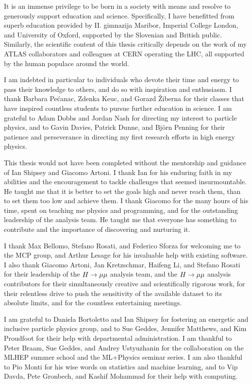 \begin{acknowledgements}

It is an immense privilege to be born in a society with means and resolve
to generously support education and science. Specifically, I have benefitted
from superb education provided by II. gimnazija Maribor, Imperial College
London, and University of Oxford, supported by the Slovenian and British
public. Similarly, the scientific content of this thesis critically depends
on the work of my ATLAS collaborators and colleagues at CERN operating the
LHC, all supported by the human populace around the world.

I am indebted in particular to individuals who devote their time and energy
to pass their knowledge to others, and do so with inspiration and enthusiasm.
I thank Barbara Pe\'canac, Zdenka Keuc, and Gorazd
\v{Z}iberna for their classes that have inspired countless students to pursue
further education in science. I am grateful to Adam Dobbs and Jordan Nash for
directing my interest to particle physics, and to Gavin Davies, Patrick Dunne,
and Bj\"{o}rn Penning for their patience and perseverance in directing my
first research efforts in high energy physics.

This thesis would not have been completed without the mentorship and guidance
of Ian Shipsey and Giacomo Artoni. I thank Ian for his enduring faith in my
abilities and the encouragement to tackle challenges that seemed insurmountable.
He taught me that it is better to set the goals high and never reach them,
than to set them too low and achieve them.
I thank Giacomo for the many hours of his time, spent on teaching me physics and
programming, and for the outstanding leadership of the analysis team. He taught
me that everyone has something to contribute and the importance of discovering 
and nurturing it.

I thank Max Bellomo, Stefano Rosati, and Federico Sforza for welcoming me to
the MCP group, and Arthur Lesage for his invaluable help with existing
software. I also thank Giacomo Artoni, Jan Kretzschmar, Haifeng Li, and Stefano
Rosati for their leadership of the $H \rightarrow \mu\mu$ analysis team, and the $H \rightarrow \mu\mu$
analysis contributors for their simultaneously creative and scientifically
rigorous work, for their relentless drive to push the sensitivity of the
available dataset to its absolute limits, and for the countless entertaining
meetings.

I am grateful to Daniela Bortoletto and Ian Shipsey for fostering an energetic
and inclusive particle physics group, and to Sue Geddes, Jennifer Matthews,
and Kim Proudfoot for their help with departmental administration. I am
thankful to Peter Braam, Sue Geddes, and Andrey Ustyuzhanin for the
collaboration on the MLHEP summer school and the ML+Physics seminar series.
I am also thankful to Pio Monti for his wise words on statistics and machine
learning, and to Vip Davda, Pete Gronbech, and Kashif Mohammad for their help
with computing.


\end{acknowledgements}
